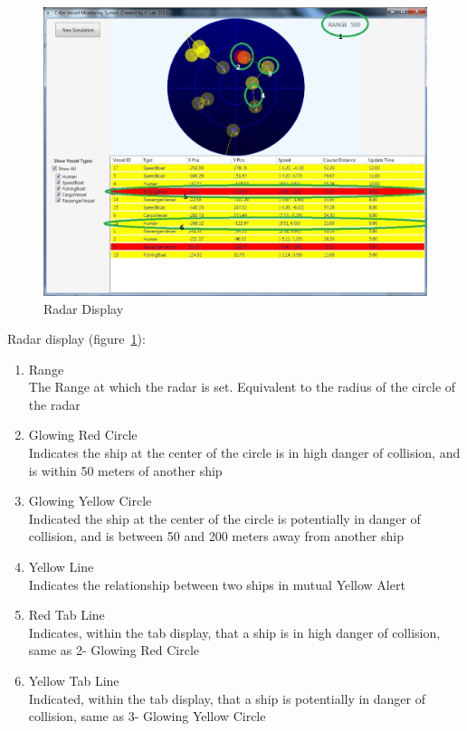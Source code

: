 \documentclass[12pt]{article}
\begin{document}
\begin{enumerate} [(a)]
\vspace*{0.2in}

\begin{figure}[h!]
    \centering
    \includegraphics[scale=1]{ref2}
    \caption{Radar Display}
    \label{fig:Radar Display}
\end{figure}\par

Radar display (figure~\ref{fig:Radar Display}):
\begin{enumerate}[(1)]
\item Range\\
The Range at which the radar is set. Equivalent to the radius of the circle of the radar
\clearpage
\item Glowing Red Circle\\
Indicates the ship at the center of the circle is in high danger of collision, and is within 50 meters of another ship
\item Glowing Yellow Circle\\
Indicated the ship at the center of the circle is potentially in danger of collision, and is between 50 and 200 meters away from another ship
\item Yellow Line\\
Indicates the relationship between two ships in mutual Yellow Alert
\item Red Tab Line\\
Indicates, within the tab display, that a ship is in high danger of collision, same as 2- Glowing Red Circle
\item Yellow Tab Line\\
Indicated, within the tab display, that a ship is potentially in danger of collision, same as 3- Glowing Yellow Circle



\end{enumerate}






\end{enumerate}
\end{document}
